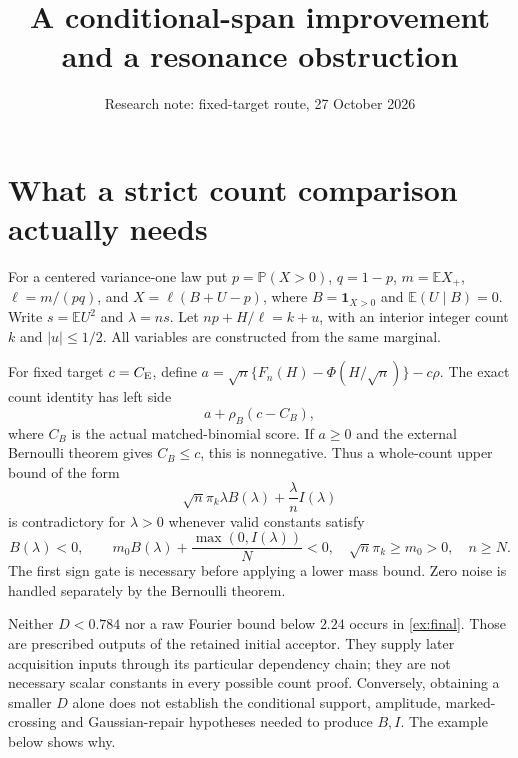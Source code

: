 \documentclass[11pt]{article}
\title{A conditional-span improvement and a resonance obstruction}
\author{Research note: fixed-target route, 27 October 2026}
\date{}
\newcommand{\E}{\mathbb E}
\newcommand{\Pp}{\mathbb P}
\newcommand{\CE}{C_{\rm E}}
\begin{document}
\maketitle

\section{What a strict count comparison actually needs}
For a centered variance-one law put $p=\Pp(X>0)$, $q=1-p$,
$m=\E X_+$, $\ell=m/(pq)$, and
$X=\ell(B+U-p)$, where $B=\mathbf1_{X>0}$ and
$\E(U\mid B)=0$. Write $s=\E U^2$ and $\lambda=ns$.
Let $np+H/\ell=k+u$, with an interior integer count $k$ and
$|u|\le1/2$. All variables are constructed from the same marginal.

For fixed target $c=\CE$, define
$a=\sqrt n\{F_n(H)-\Phi(H/\sqrt n)\}-c\rho$.
The exact count identity has left side
\[
                     a+\rho_B(c-C_B),
\]
where $C_B$ is the actual matched-binomial score. If $a\ge0$ and
the external Bernoulli theorem gives $C_B\le c$, this is nonnegative.
Thus a whole-count upper bound of the form
\[
 \sqrt n\pi_k\lambda B(\lambda)+\frac{\lambda}{n}I(\lambda)
\]
is contradictory for $\lambda>0$ whenever valid constants satisfy
\begin{equation}\label{ex:final}
 B(\lambda)<0,\qquad
 m_0B(\lambda)+\frac{\max(0,I(\lambda))}{N}<0,
 \quad \sqrt n\pi_k\ge m_0>0,
 \quad n\ge N.
\end{equation}
The first sign gate is necessary before applying a lower mass bound.
Zero noise is handled separately by the Bernoulli theorem.

Neither $D<0.784$ nor a raw Fourier bound below $2.24$ occurs in
\eqref{ex:final}. Those are prescribed outputs of the retained initial
acceptor. They supply later acquisition inputs through its particular
dependency chain; they are not necessary scalar constants in every possible
count proof. Conversely, obtaining a smaller $D$ alone does not establish
the conditional support, amplitude, marked-crossing and Gaussian-repair
hypotheses needed to produce $B,I$. The example below shows why.
\end{document}
